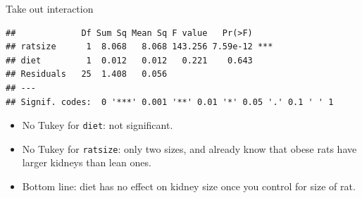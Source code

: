 \begin{frame}[fragile]{Take out interaction}
  
\begin{knitrout}
\color{fgcolor}\begin{kframe}
\begin{alltt}
\hlkwb{=}\hlopt{~}\hlopt{+}
\end{alltt}
\begin{verbatim}
##             Df Sum Sq Mean Sq F value   Pr(>F)    
## ratsize      1  8.068   8.068 143.256 7.59e-12 ***
## diet         1  0.012   0.012   0.221    0.643    
## Residuals   25  1.408   0.056                     
## ---
## Signif. codes:  0 '***' 0.001 '**' 0.01 '*' 0.05 '.' 0.1 ' ' 1
\end{verbatim}
\end{kframe}
\end{knitrout}

\begin{itemize}
\item No Tukey for \texttt{diet}: not significant.
\item No Tukey for \texttt{ratsize}: only two sizes, and already know
  that obese rats have larger kidneys than lean ones.
\item Bottom line: diet has no effect on kidney size once you control
  for size of rat.
\end{itemize}
  
\end{frame}



